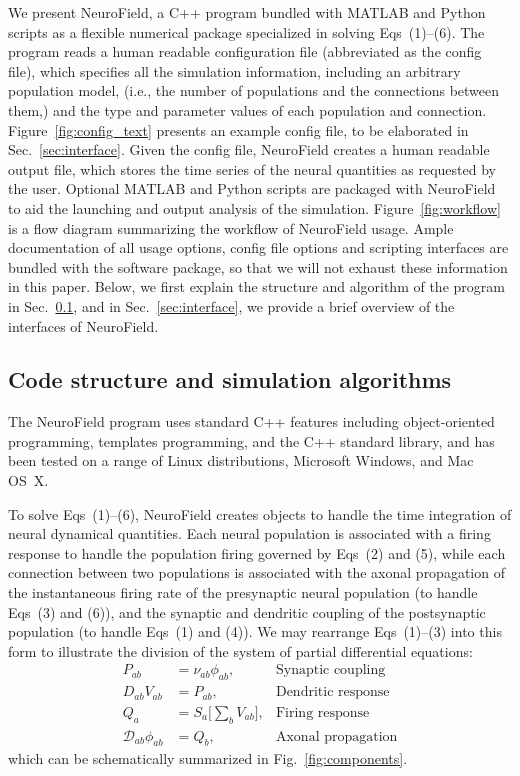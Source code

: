 \documentclass[preprint,review,10pt,authoryear,letterpaper]{elsarticle}
\begin{document}
We present NeuroField, a C++ program bundled with MATLAB and Python scripts as a flexible numerical package specialized in solving Eqs~(1)--(6). The program reads a human readable configuration file (abbreviated as the config file), which specifies all the simulation information, including an arbitrary population model, (i.e., the number of populations and the connections between them,) and the type and parameter values of each population and connection. Figure~\ref{fig:config_text} presents an example config file, to be elaborated in Sec.~\ref{sec:interface}. Given the config file, NeuroField creates a human readable output file, which stores the time series of the neural quantities as requested by the user. Optional MATLAB and Python scripts are packaged with NeuroField to aid the launching and output analysis of the simulation. Figure~\ref{fig:workflow} is a flow diagram summarizing the workflow of NeuroField usage. Ample documentation of all usage options, config file options and scripting interfaces are bundled with the software package, so that we will not exhaust these information in this paper. Below, we first explain the structure and algorithm of the program in Sec.~\ref{sec:neurofield}, and in Sec.~\ref{sec:interface}, we provide a brief overview of the interfaces of NeuroField.

\subsection{Code structure and simulation algorithms}
\label{sec:neurofield}

The NeuroField program uses standard C++ features including object-ori\-ented programming, templates programming, and the C++ standard library, and has been tested on a range of Linux distributions, Microsoft Windows, and Mac OS~X.

To solve Eqs~(1)--(6), NeuroField creates objects to handle the time integration of neural dynamical quantities. Each neural population is associated with a firing response to handle the population firing governed by Eqs~(2) and (5), while each connection between two populations is associated with the axonal propagation of the instantaneous firing rate of the presynaptic neural population (to handle Eqs~(3) and (6)), and the synaptic and dendritic coupling of the postsynaptic population (to handle Eqs~(1) and (4)). We may rearrange Eqs~(1)--(3) into this form to illustrate the division of the system of partial differential equations:
\begin{align}
	P_{ab} &= \nu_{ab}\phi_{ab}, & \text{Synaptic coupling}\\
	D_{ab}V_{ab} &= P_{ab}, & \text{Dendritic response}\\
	Q_a &= S_a \big[\sum_b V_{ab} \big], & \text{Firing response}\\
	\mathcal{D}_{ab}\phi_{ab} &= Q_b,&  \text{Axonal propagation}
\end{align}
which can be schematically summarized in Fig.~\ref{fig:components}.
\end{document}
